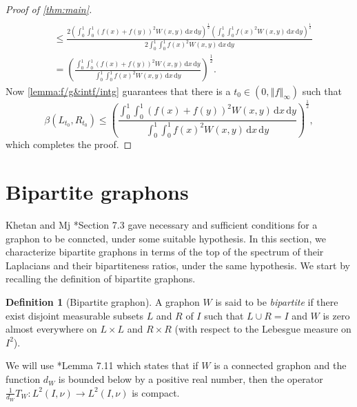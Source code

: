 \documentclass[12pt,a4paper,bold]{thesis}
\theoremstyle{definition}
\newtheorem{defn}[thm]{Definition}
\newcommand*{\map}[3]{#1 \colon #2 \to #3}
\newcommand*{\norm}[2][]{\left\Vert #2 \right\Vert_{#1}}
\begin{document}
\begin{proof}[Proof of \cref{thm:main}]
\begin{align*}
        \\
        & \leq
        \frac{2 \left(\int_{0}^{1} \int_{0}^{1} (f(x) + f(y))^2 W(x,y)\, \mathrm{d}x\, 
        \mathrm{d}y\right)^\frac{1}{2} \left(\int_{0}^{1} \int_{0}^{1} f(x)^2 W(x,y)\, 
        \mathrm{d}x\, \mathrm{d}y\right)^\frac{1}{2}}
        {2 \int_{0}^{1} \int_{0}^{1} f(x)^2 W(x,y)\, \mathrm{d}x\, \mathrm{d}y}
        \\
        & =
        \left(\frac{\int_0^1 \int_0^1 (f(x) + f(y))^2 W(x,y)\, \mathrm{d}x\, \mathrm{d}y}
        {\int_0^1 \int_0^1 f(x)^2 W(x,y)\, \mathrm{d}x\, \mathrm{d}y}\right)^\frac{1}{2}.
    \end{align*}
    Now \cref{lemma:f/g&intf/intg} guarantees that there is a 
    $t_0 \in (0, \norm[\infty]{f})$ such that 
    \begin{equation*}
        \beta(L_{t_0},R_{t_0}) \leq 
        \left(\frac{\int_0^1 \int_0^1 (f(x) + f(y))^2 W(x,y)\, \mathrm{d}x\, \mathrm{d}y}
        {\int_0^1 \int_0^1 f(x)^2 W(x,y)\, \mathrm{d}x\, \mathrm{d}y}\right)^\frac{1}{2},
    \end{equation*}
    which completes the proof.
\end{proof}

\section{Bipartite graphons} \label{section:bipartiteGraphons}

Khetan and Mj \cite{Abhishek-Mahan24}*{Section 7.3} gave necessary and sufficient
conditions for a graphon to be conncted, under some suitable hypothesis.
In this section, we characterize bipartite graphons in terms of the top of the spectrum
of their Laplacians and their bipartiteness ratios, under the same hypothesis. 
We start by recalling the definition of bipartite graphons.

\begin{defn}[Bipartite graphon]
    A graphon $W$ is said to be \emph{bipartite} if there exist disjoint measurable subsets
    $L$ and $R$ of $I$ such that $L \cup R = I$ and $W$ is zero almost everywhere
    on $L \times L$ and $R \times R$ (with respect to the Lebesgue measure on $I^2$).
\end{defn}

We will use \cite{Abhishek-Mahan24}*{Lemma 7.11} which states that if $W$ is
a connected graphon and the function $d_W$ is bounded below by a positive real number,
then the operator $\map{\frac{1}{d_W} T_W}{L^2(I,\nu)}{L^2(I,\nu)}$ is compact.
\end{document}
